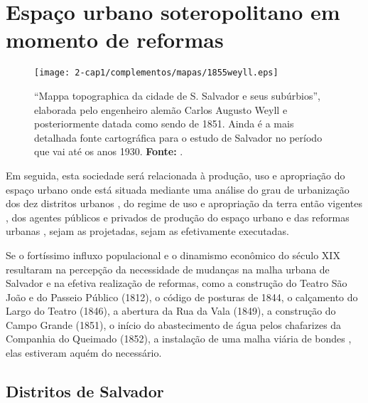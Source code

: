 \section{Espaço urbano soteropolitano em momento de reformas}\label{sec:1.4}

\begin{figure}[!htp]
\centering
\texttt{[image: 2-cap1/complementos/mapas/1855weyll.eps]} 
\caption{``Mappa topographica da cidade de S. Salvador e seus subúrbios'', elaborada pelo engenheiro alemão Carlos Augusto Weyll e posteriormente datada como sendo de 1851. Ainda é a mais detalhada fonte cartográfica para o estudo de Salvador no período que vai até os anos 1930. \textbf{Fonte:} .}
\end{figure}

Em seguida, esta sociedade será relacionada à produção, uso e apropriação do espaço urbano onde está situada mediante uma análise do grau de urbanização dos dez distritos urbanos \cite{NASCIMENTO2007, VASCONCELOS2002}, do regime de uso e apropriação da terra então vigentes \cite{CEDURB1978}, dos agentes públicos e privados de produção do espaço urbano e das reformas urbanas \cite{cardoso_vilas_1991, CUNHA2011}, sejam as projetadas, sejam as efetivamente executadas.

Se o fortíssimo influxo populacional e o dinamismo econômico do século XIX resultaram na percepção da necessidade de mudanças na malha urbana de Salvador e na efetiva realização de reformas, como a construção do Teatro São João e do Passeio Público (1812), o código de posturas de 1844, o calçamento do Largo do Teatro (1846), a abertura da Rua da Vala (1849), a construção do Campo Grande (1851), o início do abastecimento de água pelos chafarizes da Companhia do Queimado (1852), a instalação de uma malha viária de bondes \cite{fernandesgomes1992, fernandessampaiogomes1999,NASCIMENTO2007,sampaio_50_2005}, elas estiveram aquém do necessário.

\subsection{Distritos de Salvador}\label{subsec:1.4.1}

